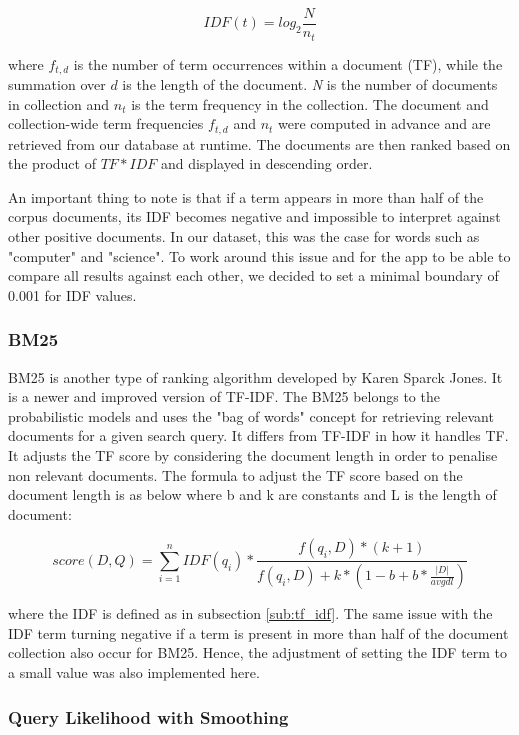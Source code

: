 $$IDF(t) = log_2 \frac{N}{n_t}$$

where $f_{t,d}$ is the number of term occurrences within a document (TF), while the summation over $d$ is the length of the document. \emph{N} is the number of documents in collection and $n_t$ is the term frequency in the collection. The document and collection-wide term frequencies $f_{t,d}$ and $n_t$ were computed in advance and are retrieved from our database at runtime. The documents are then ranked based on the product of $TF * IDF$ and displayed in descending order.

An important thing to note is that if a term appears in more than half of the corpus documents, its IDF becomes negative and impossible to interpret against other positive documents. In our dataset, this was the case for words such as "computer" and "science". To work around this issue and for the app to be able to compare all results against each other, we decided to set a minimal boundary of 0.001 for IDF values.


\subsubsection{BM25} %
\label{ssub:BM25}

BM25 is another type of ranking algorithm developed by Karen Sparck Jones. It is a newer and improved version of TF-IDF. The BM25 belongs to the probabilistic models and uses the "bag of words" concept for retrieving relevant documents for a given search query. It differs from TF-IDF in how it handles TF. It adjusts the TF score by considering the document length in order to penalise non relevant documents. The formula to adjust the TF score based on the document length is as below where b and k are constants and L is the length of document:

$$ score(D, Q) = \sum_{i=1}^n IDF(q_i) * \frac{f(q_i, D)* (k + 1)}{f(q_i, D) + k * (1-b + b * \frac{|D|}{avgdl})}$$

where the IDF is defined as in subsection \ref{sub:tf_idf}. The same issue with the IDF term turning negative if a term is present in more than half of the document collection also occur for BM25. Hence, the adjustment of setting the IDF term to a small value was also implemented here.


\subsubsection{Query Likelihood with Smoothing} %
\label{ssub:query_likelihood_with_smoothing}

